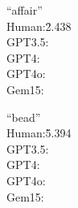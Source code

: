 \begin{center}
\begin{minipage}{0.45\linewidth}
\begin{tabbing}
``affair'' \\
\hspace{1em}Human:\quad \= 2.438 \\
\hspace{1em}GPT3.5: \\
\hspace{1em}GPT4: \\
\hspace{1em}GPT4o: \\
\hspace{1em}Gem15:
\end{tabbing}
\end{minipage}
\hspace{0.05\linewidth}
\begin{minipage}{0.45\linewidth}
\begin{tabbing}
``bead'' \\
\hspace{1em}Human:\quad \= 5.394 \\
\hspace{1em}GPT3.5: \\
\hspace{1em}GPT4: \\
\hspace{1em}GPT4o: \\
\hspace{1em}Gem15:
\end{tabbing}
\end{minipage}
\end{center}

